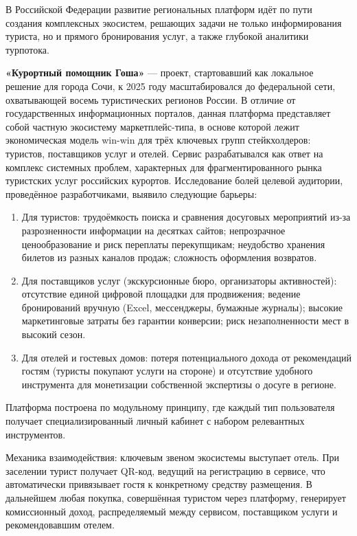 В Российской Федерации развитие региональных платформ идёт по пути создания комплексных экосистем, решающих задачи не только информирования туриста, но и прямого бронирования услуг, а также глубокой аналитики турпотока.

\textbf{«Курортный помощник Гоша»} --- проект, стартовавший как локальное решение для города Сочи, к 2025 году масштабировался до федеральной сети, охватывающей восемь туристических регионов России. В отличие от государственных информационных порталов, данная платформа представляет собой частную экосистему маркетплейс-типа, в основе которой лежит экономическая модель win-win для трёх ключевых групп стейкхолдеров: туристов, поставщиков услуг и отелей.
Сервис разрабатывался как ответ на комплекс системных проблем, характерных для фрагментированного рынка туристских услуг российских курортов. Исследование болей целевой аудитории, проведённое разработчиками, выявило следующие барьеры:
\begin{enumerate}
	\item Для туристов: трудоёмкость поиска и сравнения досуговых мероприятий из-за разрозненности информации на десятках сайтов; непрозрачное ценообразование и риск переплаты перекупщикам; неудобство хранения билетов из разных каналов продаж; сложность оформления возвратов.
	\item Для поставщиков услуг (экскурсионные бюро, организаторы активностей): отсутствие единой цифровой площадки для продвижения; ведение бронирований вручную (Excel, мессенджеры, бумажные журналы); высокие маркетинговые затраты без гарантии конверсии; риск незаполненности мест в высокий сезон.
	\item Для отелей и гостевых домов: потеря потенциального дохода от рекомендаций гостям (туристы покупают услуги на стороне) и отсутствие удобного инструмента для монетизации собственной экспертизы о досуге в регионе.
\end{enumerate}

Платформа построена по модульному принципу, где каждый тип пользователя получает специализированный личный кабинет с набором релевантных инструментов.

Механика взаимодействия: ключевым звеном экосистемы выступает отель. При заселении турист получает QR-код, ведущий на регистрацию в сервисе, что автоматически привязывает гостя к конкретному средству размещения. В дальнейшем любая покупка, совершённая туристом через платформу, генерирует комиссионный доход, распределяемый между сервисом, поставщиком услуги и рекомендовавшим отелем.

